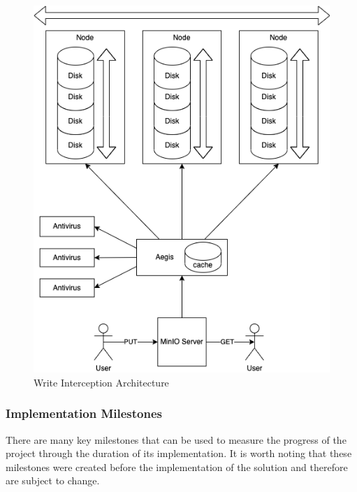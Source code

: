 \documentclass[12pt, conference, final, a4paper, onecolumn, compsoc]{IEEEtran}
\begin{document}
\begin{figure}
  \centering \includegraphics[scale=.3]{diagrams/write-intercept.png}
  \caption{Write Interception Architecture}
  \label{fig:writeInterceptArch}
\end{figure}









\subsubsection*{Implementation
  Milestones} %

There are many key milestones that can be used to measure the progress of the
project through the duration of its implementation. It is worth noting that
these milestones were created before the implementation of the solution and
therefore are subject to change.
\end{document}
